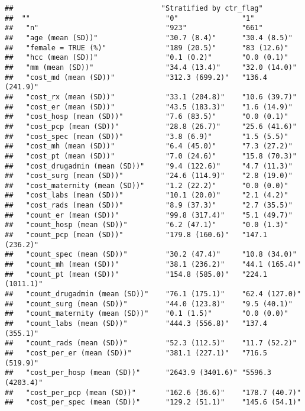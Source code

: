 \documentclass[]{article}
\begin{document}
\begin{verbatim}
##                                   "Stratified by ctr_flag"
##  ""                                "0"               "1"              
##   "n"                              "923"             "661"            
##   "age (mean (SD))"                "30.7 (8.4)"      "30.4 (8.5)"     
##   "female = TRUE (%)"              "189 (20.5)"      "83 (12.6)"      
##   "hcc (mean (SD))"                "0.1 (0.2)"       "0.0 (0.1)"      
##   "mm (mean (SD))"                 "34.4 (13.4)"     "32.0 (14.0)"    
##   "cost_md (mean (SD))"            "312.3 (699.2)"   "136.4 (241.9)"  
##   "cost_rx (mean (SD))"            "33.1 (204.8)"    "10.6 (39.7)"    
##   "cost_er (mean (SD))"            "43.5 (183.3)"    "1.6 (14.9)"     
##   "cost_hosp (mean (SD))"          "7.6 (83.5)"      "0.0 (0.1)"      
##   "cost_pcp (mean (SD))"           "28.8 (26.7)"     "25.6 (41.6)"    
##   "cost_spec (mean (SD))"          "3.8 (6.9)"       "1.5 (5.5)"      
##   "cost_mh (mean (SD))"            "6.4 (45.0)"      "7.3 (27.2)"     
##   "cost_pt (mean (SD))"            "7.0 (24.6)"      "15.8 (70.3)"    
##   "cost_drugadmin (mean (SD))"     "9.4 (122.6)"     "4.7 (11.3)"     
##   "cost_surg (mean (SD))"          "24.6 (114.9)"    "2.8 (19.0)"     
##   "cost_maternity (mean (SD))"     "1.2 (22.2)"      "0.0 (0.0)"      
##   "cost_labs (mean (SD))"          "10.1 (20.0)"     "2.1 (4.2)"      
##   "cost_rads (mean (SD))"          "8.9 (37.3)"      "2.7 (35.5)"     
##   "count_er (mean (SD))"           "99.8 (317.4)"    "5.1 (49.7)"     
##   "count_hosp (mean (SD))"         "6.2 (47.1)"      "0.0 (1.3)"      
##   "count_pcp (mean (SD))"          "179.8 (160.6)"   "147.1 (236.2)"  
##   "count_spec (mean (SD))"         "30.2 (47.4)"     "10.8 (34.0)"    
##   "count_mh (mean (SD))"           "38.1 (236.2)"    "44.1 (165.4)"   
##   "count_pt (mean (SD))"           "154.8 (585.0)"   "224.1 (1011.1)" 
##   "count_drugadmin (mean (SD))"    "76.1 (175.1)"    "62.4 (127.0)"   
##   "count_surg (mean (SD))"         "44.0 (123.8)"    "9.5 (40.1)"     
##   "count_maternity (mean (SD))"    "0.1 (1.5)"       "0.0 (0.0)"      
##   "count_labs (mean (SD))"         "444.3 (556.8)"   "137.4 (355.1)"  
##   "count_rads (mean (SD))"         "52.3 (112.5)"    "11.7 (52.2)"    
##   "cost_per_er (mean (SD))"        "381.1 (227.1)"   "716.5 (519.9)"  
##   "cost_per_hosp (mean (SD))"      "2643.9 (3401.6)" "5596.3 (4203.4)"
##   "cost_per_pcp (mean (SD))"       "162.6 (36.6)"    "178.7 (40.7)"   
##   "cost_per_spec (mean (SD))"      "129.2 (51.1)"    "145.6 (54.1)"   

\end{verbatim}
\end{document}
